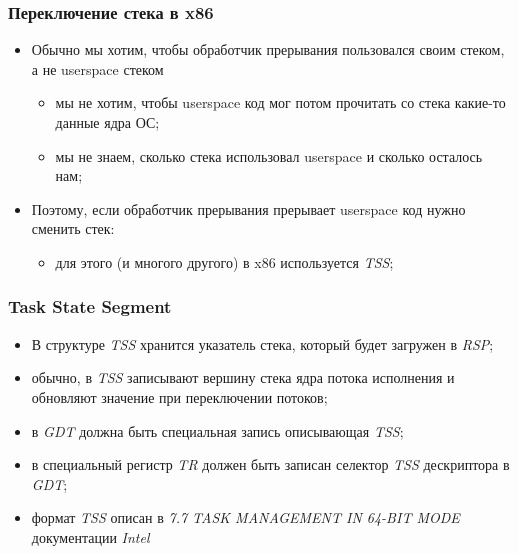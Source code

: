 \begin{frame}
\frametitle{Переключение стека в x86}
\begin{itemize}
  \item<1-> Обычно мы хотим, чтобы обработчик прерывания пользовался своим стеком, а не userspace стеком
    \begin{itemize}
      \item мы не хотим, чтобы userspace код мог потом прочитать со стека какие-то данные ядра ОС;
      \item мы не знаем, сколько стека использовал userspace и сколько осталось нам;
    \end{itemize}
  \item<2-> Поэтому, если обработчик прерывания прерывает userspace код нужно сменить стек:
    \begin{itemize}
      \item для этого (и многого другого) в x86 используется \emph{TSS};
    \end{itemize}
\end{itemize}
\end{frame}

\begin{frame}
\frametitle{Task State Segment}
\begin{itemize}
  \item В структуре \emph{TSS} хранится указатель стека, который будет загружен в \emph{RSP};
  \item обычно, в \emph{TSS} записывают вершину стека ядра потока исполнения и обновляют значение при переключении потоков;
  \item в \emph{GDT} должна быть специальная запись описывающая \emph{TSS};
  \item в специальный регистр \emph{TR} должен быть записан селектор \emph{TSS} дескриптора в \emph{GDT};
  \item формат \emph{TSS} описан в \emph{7.7 TASK MANAGEMENT IN 64-BIT MODE} документации \emph{Intel}
\end{itemize}
\end{frame}
